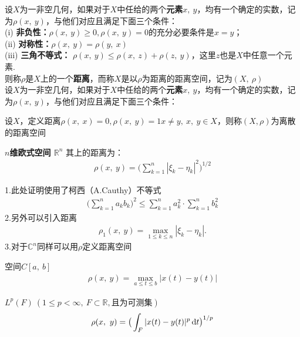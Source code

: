\begin{newdef}
    设$X$为一非空几何，如果对于$X$中任给的两个\textbf{元素}$x,\ y$，均有一个确定的实数，记为$\rho\left( x, \ y \right)$，与他们对应且满足下面三个条件：\\
    (i) \textbf{非负性：}$\rho (x,\ y)\geqslant 0, \rho (x,\ y)=0 $的充分必要条件是$x=y$；\\
    (ii) \textbf{对称性：}$\rho (x,\ y)=\rho (y, \ x)$\\
    (iii) \textbf{三角不等式：} $\rho (x,\ y)\leqslant \rho (x,\ z)+\rho (z, \ y)$，这里$z$也是$X$中任意一个元素.\\
    则称$\rho $是$X$上的一个\textbf{距离}，而称$X$是以$\rho$为距离的距离空间，记为$(X, \ \rho)$\\
    设$X$为一非空几何，如果对于$X$中任给的两个\textbf{元素}$x,\ y$，均有一个确定的实数，记为$\rho\left( x, \ y \right)$，与他们对应且满足下面三个条件：
\end{newdef}

\begin{note}
    设$X$，定义距离$\rho(x, \ x )=0, \rho(x, \ y)=1 x\neq y, \ x, \ y \in X$，则称$(X,\rho)$为离散的距离空间
\end{note}


\begin{newex}
     \textbf{$n$维欧式空间 $\mathbb R ^n$}
    其上的距离为：
    \begin{align}
        \rho (x, \ y)=\big( \sum\limits_{k=1}^n | \xi_k- \eta_k|^2 \big)^{1/2}
    \end{align}
\end{newex}

\begin{note}
   1.此处证明使用了柯西（A.Cauthy）不等式
    \begin{align}
    \big(\sum \limits_{k=1}^n a_k b_k \big)^2 \leqslant \sum \limits_{k=1}^n a_k^2 \cdot \sum \limits_{k=1}^n b_k^2 
    \end{align}
   2.另外可以引入距离
    \begin{align*}
        \rho_1(x,\ y)=\max \limits_{1\leqslant k \leqslant n}|\xi_k-\eta_k|. \tag*{(1')}
    \end{align*}
   3.对于$\mathbb C^n$同样可以用$\rho$定义距离空间
\end{note}

\begin{newex}
    空间$C[a,\ b]$\ 
    \begin{align}
        \rho(x, \ y)=\max\limits_{a \leqslant t \leqslant b} |x(t)-y(t)|
    \end{align}
\end{newex}

\begin{newex}
    $L^p(F) \ (1 \leqslant p < \infty , \ F \subset \mathbb R , \mbox{且为可测集})$\
   \begin{align}
         \rho (x , \ y)= \big( \int_{F} |x(t)-y(t)|^p \operatorname{d\!} t \big)^{1/p}
    \end{align} 
\end{newex}
\begin{note}
  
\end{note}
